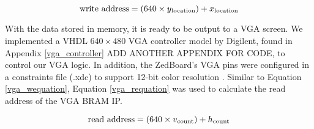 \begin{equation}
	\textrm{write address} = (640\times{}y\textsubscript{location})+ x\textsubscript{location}
	\label{vga_wequation}
\end{equation}

\par
With the data stored in memory, it is ready to be output to a VGA screen. We implemented a VHDL $640\times480$ VGA controller model by Digilent, found in Appendix \ref{vga_controller} ADD ANOTHER APPENDIX FOR CODE, to control our VGA logic. In addition, the ZedBoard's VGA pins were configured in a constraints file (.xdc) to support 12-bit color resolution \cite{zedboard_datasheet}. Similar to Equation \ref{vga_wequation}, Equation \ref{vga_requation} was used to calculate the read address of the VGA BRAM IP.

\begin{equation}
	\textrm{read address} = (640\times{}v\textsubscript{count})+ h\textsubscript{count}
	\label{vga_requation}
\end{equation}


